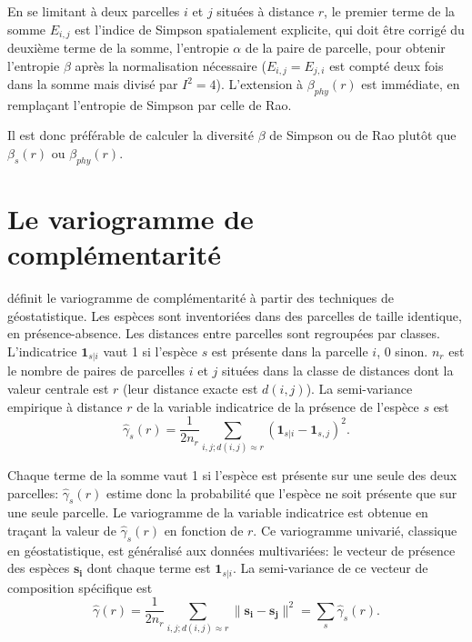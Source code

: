 \documentclass[
  11pt,
  french,
  a4paper,
  extrafontsizes,onecolumn,openright
  ]{memoir}
\begin{document}
En se limitant à deux parcelles \(i\) et \(j\) situées à distance \(r\), le premier terme de la somme \(E_{i,j}\) est l'indice de Simpson spatialement explicite, qui doit être corrigé du deuxième terme de la somme, l'entropie \(\alpha\) de la paire de parcelle, pour obtenir l'entropie \(\beta\) après la normalisation nécessaire (\(E_{i,j}=E_{j,i}\) est compté deux fois dans la somme mais divisé par \(I^2=4\)).
L'extension à \(\beta_{phy}(r)\) est immédiate, en remplaçant l'entropie de Simpson par celle de Rao.

Il est donc préférable de calculer la diversité \(\beta\) de Simpson ou de Rao plutôt que \(\beta_{s}(r)\) ou \(\beta_{phy}(r)\).

\hypertarget{le-variogramme-de-compluxe9mentarituxe9}{%
\section{Le variogramme de complémentarité}\label{le-variogramme-de-compluxe9mentarituxe9}}

\textcite{Wagner2003} définit le variogramme de complémentarité à partir des techniques de géostatistique.
Les espèces sont inventoriées dans des parcelles de taille identique, en présence-absence.
Les distances entre parcelles sont regroupées par classes.
L'indicatrice \({\mathbf 1}_{s|i}\) vaut 1 si l'espèce \(s\) est présente dans la parcelle \(i\), 0 sinon.
\(n_r\) est le nombre de paires de parcelles \(i\) et \(j\) situées dans la classe de distances dont la valeur centrale est \(r\) (leur distance exacte est \(d(i,j)\)).
La semi-variance empirique à distance \(r\) de la variable indicatrice de la présence de l'espèce \(s\) est
\begin{equation}
  \label{eq:Estgammasr}
  \hat{\gamma}_{s}(r) = \frac{1}{2 n_r} \sum_{i,j;d(i,j)\approx r}{({\mathbf 1}_{s|i} - {\mathbf 1}_{s,j})^2}.
\end{equation}

Chaque terme de la somme vaut 1 si l'espèce est présente sur une seule des deux parcelles: \(\hat{\gamma}_{s}(r)\) estime donc la probabilité que l'espèce ne soit présente que sur une seule parcelle.
Le variogramme de la variable indicatrice est obtenue en traçant la valeur de \(\hat{\gamma}_{s}(r)\) en fonction de \(r\).
Ce variogramme univarié, classique en géostatistique, est généralisé aux données multivariées: le vecteur de présence des espèces \(\mathbf{s_i}\) dont chaque terme est \({\mathbf 1}_{s|i}\).
La semi-variance de ce vecteur de composition spécifique est
\begin{equation}
  \label{eq:Estgammar}
  \hat{\gamma}(r) 
  = \frac{1}{2 n_r} \sum_{i,j;d(i,j)\approx r}{\| \mathbf{s_i}-\mathbf{s_j} \|^2}
  = \sum_{s}{\hat{\gamma}_{s}(r)}.
\end{equation}
\end{document}
